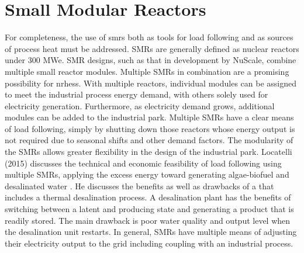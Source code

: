 \section{Small Modular Reactors}
For completeness, the use of \ac{smrs} both as tools for load following and as sources of process heat must be addressed. SMRs are generally defined as nuclear reactors under 300 MWe. SMR designs, such as that in development by NuScale, combine multiple small reactor modules. Multiple SMRs in combination are a promising possibility for \ac{nrhess}.  With multiple reactors, individual modules can be assigned to meet the industrial process energy demand, with others solely used for electricity generation. Furthermore, as electricity demand grows, additional modules can be added to the industrial park. Multiple SMRs have a clear means of load following, simply by shutting down those reactors whose energy output is not required due to seasonal shifts and other demand factors. The modularity of the SMRs allows greater flexibility in the design of the industrial park.  Locatelli (2015) discusses the technical and economic feasibility of load following using multiple SMRs, applying the excess energy toward generating algae-biofuel and desalinated water \cite{Locatelli2015}. He discusses the benefits as well as drawbacks of a \cite{nrhes} that includes a thermal desalination process. A desalination plant has the benefits of switching between a latent and producing state and generating a product that is readily stored. The main drawback is poor water quality and output level when the desalination unit restarts. In general, SMRs have multiple means of adjusting their electricity output to the grid including coupling with an industrial process.

